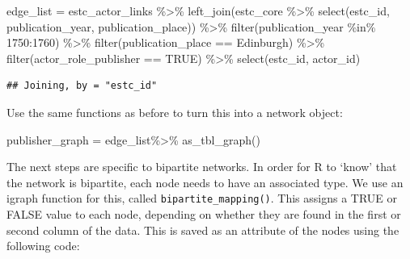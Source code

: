 \documentclass[
]{book}
\newenvironment{Shaded}{\begin{snugshade}}{\end{snugshade}}
\newcommand{\ConstantTok}[1]{\textcolor[rgb]{0.00,0.00,0.00}{#1}}
\newcommand{\DecValTok}[1]{\textcolor[rgb]{0.00,0.00,0.81}{#1}}
\newcommand{\FunctionTok}[1]{\textcolor[rgb]{0.00,0.00,0.00}{#1}}
\newcommand{\NormalTok}[1]{#1}
\newcommand{\OtherTok}[1]{\textcolor[rgb]{0.56,0.35,0.01}{#1}}
\newcommand{\SpecialCharTok}[1]{\textcolor[rgb]{0.00,0.00,0.00}{#1}}
\newcommand{\StringTok}[1]{\textcolor[rgb]{0.31,0.60,0.02}{#1}}
\begin{document}
\begin{Shaded}
\begin{Highlighting}[]
\NormalTok{edge\_list }\OtherTok{=}\NormalTok{ estc\_actor\_links }\SpecialCharTok{\%\textgreater{}\%} \FunctionTok{left\_join}\NormalTok{(estc\_core }\SpecialCharTok{\%\textgreater{}\%} \FunctionTok{select}\NormalTok{(estc\_id, publication\_year, publication\_place)) }\SpecialCharTok{\%\textgreater{}\%} 
  \FunctionTok{filter}\NormalTok{(publication\_year }\SpecialCharTok{\%in\%} \DecValTok{1750}\SpecialCharTok{:}\DecValTok{1760}\NormalTok{) }\SpecialCharTok{\%\textgreater{}\%} 
  \FunctionTok{filter}\NormalTok{(publication\_place }\SpecialCharTok{==} \StringTok{\textquotesingle{}Edinburgh\textquotesingle{}}\NormalTok{) }\SpecialCharTok{\%\textgreater{}\%}
  \FunctionTok{filter}\NormalTok{(actor\_role\_publisher }\SpecialCharTok{==} \ConstantTok{TRUE}\NormalTok{) }\SpecialCharTok{\%\textgreater{}\%} 
  \FunctionTok{select}\NormalTok{(estc\_id, actor\_id) }
\end{Highlighting}
\end{Shaded}

\begin{verbatim}
## Joining, by = "estc_id"
\end{verbatim}

Use the same functions as before to turn this into a network object:

\begin{Shaded}
\begin{Highlighting}[]
\NormalTok{publisher\_graph  }\OtherTok{=}\NormalTok{ edge\_list}\SpecialCharTok{\%\textgreater{}\%} \FunctionTok{as\_tbl\_graph}\NormalTok{()}
\end{Highlighting}
\end{Shaded}

The next steps are specific to bipartite networks. In order for R to `know' that the network is bipartite, each node needs to have an associated type. We use an igraph function for this, called \texttt{bipartite\_mapping()}. This assigns a TRUE or FALSE value to each node, depending on whether they are found in the first or second column of the data. This is saved as an attribute of the nodes using the following code:

\begin{Shaded}
\end{Shaded}
\end{document}
